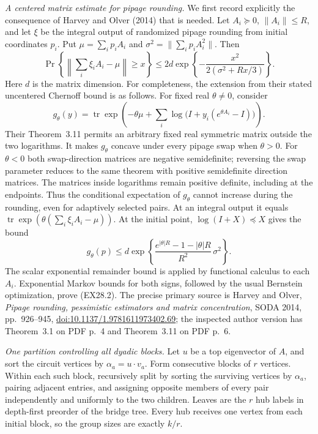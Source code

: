 \emph{A centered matrix estimate for pipage rounding.}
We first record explicitly the consequence of Harvey and Olver
(2014) that is needed. Let $A_i\succeq0$, $\|A_i\|\le R$,
and let $\xi$ be the integral output of randomized pipage rounding
from initial coordinates $p_i$. Put
$\mu=\sum_i p_iA_i$ and
$\sigma^2=\|\sum_i p_iA_i^2\|$.
Then
\[
 \Pr\left\{\left\|\sum_i\xi_iA_i-\mu\right\|\ge x\right\}
 \le2d\exp\left\{-\frac{x^2}{2(\sigma^2+Rx/3)}\right\}.
 \tag{EX28.2}
\]
Here $d$ is the matrix dimension. For completeness, the extension
from their stated uncentered Chernoff bound is as follows. For
fixed real $\theta\ne0$, consider
\[
 g_\theta(y)=\operatorname{tr}\exp\left(
       -\theta\mu+
       \sum_i\log\bigl(I+y_i(e^{\theta A_i}-I)\bigr)\right).
\]
Their Theorem~3.11 permits an arbitrary fixed real symmetric
matrix outside the two logarithms. It makes $g_\theta$ concave
under every pipage swap when $\theta>0$. For $\theta<0$ both
swap-direction matrices are negative semidefinite; reversing
the swap parameter reduces to the same theorem with positive
semidefinite direction matrices. The matrices inside logarithms
remain positive definite, including at the endpoints.
Thus the conditional expectation of $g_\theta$ cannot increase
during the rounding, even for adaptively selected pairs.
At an integral output it equals
$\operatorname{tr}\exp(\theta(\sum_i\xi_iA_i-\mu))$.
At the initial point, $\log(I+X)\preceq X$ gives the bound
\[
 g_\theta(p)\le
 d\exp\left\{
 \frac{e^{|\theta|R}-1-|\theta|R}{R^2}\,\sigma^2
 \right\}.
\]
The scalar exponential remainder bound is applied by functional
calculus to each $A_i$. Exponential Markov bounds for both signs,
followed by the usual Bernstein optimization, prove (EX28.2).
The precise primary source is Harvey and Olver,
\emph{Pipage rounding, pessimistic estimators and matrix
concentration}, SODA 2014, pp.~926--945,
\href{https://doi.org/10.1137/1.9781611973402.69}
{doi:10.1137/1.9781611973402.69}; the inspected author version
has Theorem~3.1 on PDF p.~4 and Theorem~3.11 on PDF p.~6.

\emph{One partition controlling all dyadic blocks.}
Let $u$ be a top eigenvector of $A$, and sort the circuit vertices
by $\alpha_a=u\cdot v_a$. Form consecutive blocks of $r$ vertices.
Within each such block, recursively split by sorting the surviving
vertices by $\alpha_a$, pairing adjacent entries, and assigning
opposite members of every pair independently and uniformly to
the two children. Leaves are the $r$ hub labels in depth-first
preorder of the bridge tree. Every hub receives one vertex from
each initial block, so the group sizes are exactly $k/r$.

